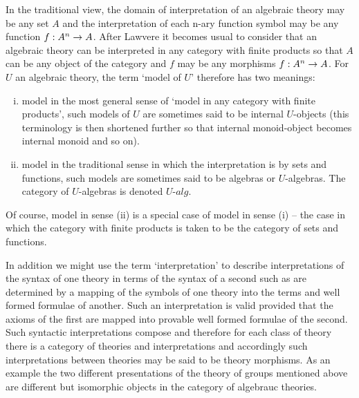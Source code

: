 \note
In the traditional view, the domain of interpretation of an algebraic theory may be any set $A$ 
and the interpretation of each n-ary function symbol may be any function $f:A^n \rightarrow A$.
After Lawvere it becomes usual to consider that an algebraic theory can be interpreted in any category with finite products
 so that $A$ can be any object of the category and  $f$ may be any morphisms $f:A^n \rightarrow A$. 
For $U$ an algebraic theory, the term `model of $U$' therefore has two meanings:
\begin{enumerate}[(i)]
\item model in the most general sense of `model in any category  with finite products',
 such models of $U$ are sometimes said to be internal $U$-objects (this terminology is then shortened further so that internal monoid-object becomes internal monoid and so on). 
\item model in the traditional sense in which the interpretation is by sets and functions, such models are sometimes said to be algebras or
$U$-algebras. The category of $U$-algebras is denoted $U$-$alg$. 
\end{enumerate} 
Of course, model in sense (ii) is a special case of model in sense (i) --  the case in which the category with finite products is taken to be the category of sets and functions.


\note In addition we might use the term `interpretation' to describe interpretations of the syntax of one theory in terms of the syntax of a second
such as are determined by a mapping of the symbols of one theory into the terms and well formed formulae of another. 
Such an interpretation is valid provided that the axioms of the first are mapped into provable well formed formulae of the second.  Such syntactic interpretations compose and therefore for each class of theory there is a category of theories and interpretations and accordingly such 
interpretations between theories may be said to be theory morphisms.
As an example the two different presentations of the theory of groups mentioned above are different but isomorphic objects in the category of algebrauc theories. 
